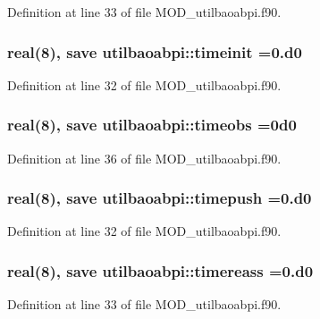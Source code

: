 Definition at line 33 of file M\-O\-D\-\_\-utilbaoabpi.\-f90.

\hypertarget{classutilbaoabpi_a6914943535cb774d1fdecae40d657e86}{
\subsubsection[{timeinit}]{\setlength{\rightskip}{0pt plus 5cm}real(8), save utilbaoabpi\-::timeinit =0.d0}}\label{classutilbaoabpi_a6914943535cb774d1fdecae40d657e86}


Definition at line 32 of file M\-O\-D\-\_\-utilbaoabpi.\-f90.

\hypertarget{classutilbaoabpi_afe30853c7b0c348013c9d7ea86aa53e0}{
\subsubsection[{timeobs}]{\setlength{\rightskip}{0pt plus 5cm}real(8), save utilbaoabpi\-::timeobs =0d0}}\label{classutilbaoabpi_afe30853c7b0c348013c9d7ea86aa53e0}


Definition at line 36 of file M\-O\-D\-\_\-utilbaoabpi.\-f90.

\hypertarget{classutilbaoabpi_af5bf31b45a8a5e575131e62483250ffb}{
\subsubsection[{timepush}]{\setlength{\rightskip}{0pt plus 5cm}real(8), save utilbaoabpi\-::timepush =0.d0}}\label{classutilbaoabpi_af5bf31b45a8a5e575131e62483250ffb}


Definition at line 32 of file M\-O\-D\-\_\-utilbaoabpi.\-f90.

\hypertarget{classutilbaoabpi_a18904bbe7e1c94539761412da71d7f29}{
\subsubsection[{timereass}]{\setlength{\rightskip}{0pt plus 5cm}real(8), save utilbaoabpi\-::timereass =0.d0}}\label{classutilbaoabpi_a18904bbe7e1c94539761412da71d7f29}


Definition at line 33 of file M\-O\-D\-\_\-utilbaoabpi.\-f90.

